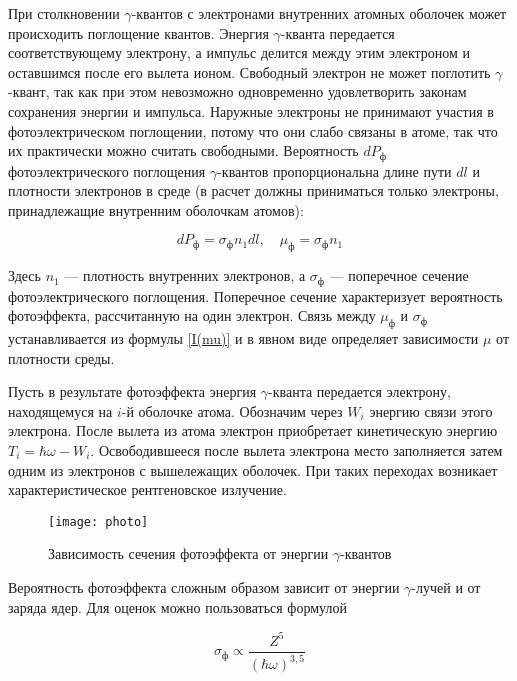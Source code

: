 При столкновении $\gamma$-квантов с электронами внутренних атомных оболочек
может происходить поглощение квантов. Энергия $\gamma$-кванта передается
соответствующему электрону, а импульс делится между этим электроном и оставшимся
после его вылета ионом. Свободный электрон не может поглотить $\gamma$-квант,
так как при этом невозможно одновременно удовлетворить законам сохранения
энергии и импульса. Наружные электроны не принимают участия в фотоэлектрическом
поглощении, потому что они слабо связаны в атоме, так что их практически можно
считать свободными. Вероятность $dP_{\text{ф}}$ фотоэлектрического поглощения
$\gamma$-квантов пропорциональна длине пути $dl$ и плотности электронов в
среде (в расчет должны приниматься только электроны, принадлежащие внутренним
оболочкам атомов):

\begin{equation}\label{mu ph}
dP_{\text{ф}} = \sigma_{\text{ф}} n_1 dl, \quad \mu_{\text{ф}} = \sigma_{\text{ф}} n_1
\end{equation}

Здесь $ n_1 $ --- плотность внутренних электронов, а $\sigma_{\text{ф}}$ --- поперечное
сечение фотоэлектрического поглощения. Поперечное сечение характеризует
вероятность фотоэффекта, рассчитанную на один электрон. Связь между $\mu_{\text{ф}}$ и
$ \sigma_{\text{ф}} $ устанавливается из формулы \eqref{I(mu)} и в явном виде определяет
зависимости $ \mu $ от плотности среды.

Пусть в результате фотоэффекта энергия $\gamma$-кванта передается электрону,
находящемуся на $ i $-й оболочке атома. Обозначим через $ W_i $ энергию связи
этого электрона. После вылета из атома электрон приобретает кинетическую энергию
$ T_i = \hbar \omega - W_i $. Освободившееся после вылета электрона место
заполняется затем одним из электронов с вышележащих оболочек. При таких
переходах возникает характеристическое рентгеновское излучение.

\begin{wrapfigure}[13]{l}{0.4\linewidth}
  \texttt{[image: photo]}
  \caption{Зависимость сечения фотоэффекта от энергии $\gamma$-квантов}
  \label{ris photo}
\end{wrapfigure}

Вероятность фотоэффекта сложным образом зависит от энергии $\gamma$-лучей и от
заряда ядер. Для оценок можно пользоваться формулой

\begin{equation}\label{sigma ph}
\sigma_{\text{ф}} \propto \dfrac{Z^5}{(\hbar\omega)^{3,5}}
\end{equation}

